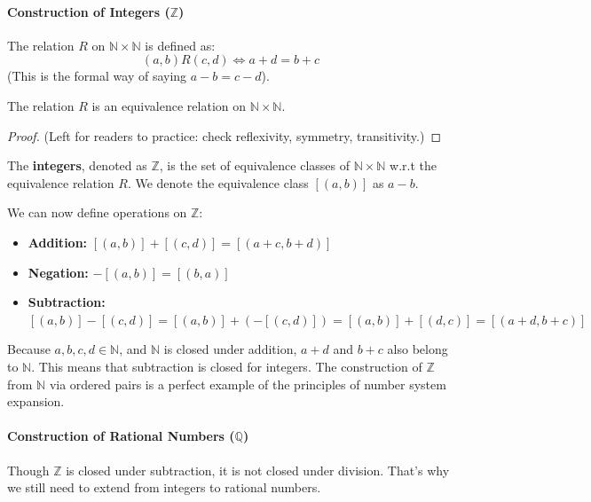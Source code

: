 \paragraph{Construction of Integers ($\mathbb{Z}$)}
\begin{definition}
The relation $R$ on $\mathbb{N} \times \mathbb{N}$ is defined as:
$$ (a,b) R (c,d) \iff a+d = b+c $$
(This is the formal way of saying $a-b = c-d$).
\end{definition}

\begin{theorem}
The relation $R$ is an equivalence relation on $\mathbb{N} \times \mathbb{N}$.
\end{theorem}
\begin{proof}
(Left for readers to practice: check reflexivity, symmetry, transitivity.)
\end{proof}

\begin{definition}
The \textbf{integers}, denoted as $\mathbb{Z}$, is the set of equivalence classes of $\mathbb{N} \times \mathbb{N}$ w.r.t the equivalence relation $R$. We denote the equivalence class $[(a,b)]$ as $a-b$.
\end{definition}

We can now define operations on $\mathbb{Z}$:
\begin{definition}
\begin{itemize}
    \item \textbf{Addition:} $[(a,b)] + [(c,d)] = [(a+c, b+d)]$
    \item \textbf{Negation:} $-[(a,b)] = [(b,a)]$
    \item \textbf{Subtraction:} $[(a,b)] - [(c,d)] = [(a,b)] + (-[(c,d)]) = [(a,b)] + [(d,c)] = [(a+d, b+c)]$
\end{itemize}
\end{definition}
Because $a,b,c,d \in \mathbb{N}$, and $\mathbb{N}$ is closed under addition, $a+d$ and $b+c$ also belong to $\mathbb{N}$. This means that subtraction is closed for integers. The construction of $\mathbb{Z}$ from $\mathbb{N}$ via ordered pairs is a perfect example of the principles of number system expansion.

\paragraph{Construction of Rational Numbers ($\mathbb{Q}$)}
Though $\mathbb{Z}$ is closed under subtraction, it is not closed under division. That’s why we still need to extend from integers to rational numbers.

